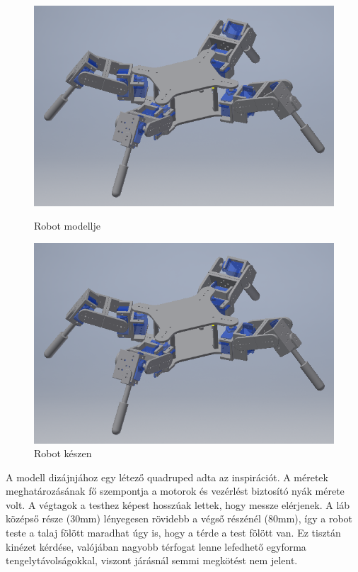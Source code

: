 \documentclass{article}
\begin{document}
\begin{figure}[h]
\centering
\begin{minipage}{0.45\textwidth}
	\centering
	\includegraphics[width=\textwidth]{fullquad}
	\caption{Robot modellje}
\end{minipage}\hfill
\begin{minipage}{0.45\textwidth}
	\centering
	\includegraphics[width=\textwidth]{fullquad}
	\caption{Robot készen}
\end{minipage}
\end{figure}
A modell dizájnjához egy létező quadruped adta az inspirációt. A méretek meghatározásának fő szempontja a motorok és vezérlést biztosító nyák mérete volt. A végtagok a testhez képest hosszúak lettek, hogy messze elérjenek. A láb középső része (30mm) lényegesen rövidebb a végső részénél (80mm), így a robot teste a talaj fölött maradhat úgy is, hogy a térde a test fölött van. Ez tisztán kinézet kérdése, valójában nagyobb térfogat lenne lefedhető egyforma tengelytávolságokkal, viszont járásnál semmi megkötést nem jelent.
\end{document}
